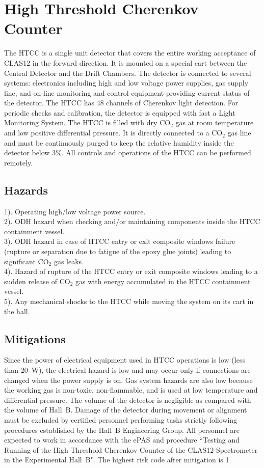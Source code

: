 \section{High Threshold Cherenkov Counter}

The HTCC is a single unit detector that covers the entire working acceptance of CLAS12 
in the forward direction. It is mounted on a special cart between the Central Detector 
and the Drift Chambers. The detector is connected to several systems: electronics including 
high and low voltage power supplies, gas supply line, and on-line monitoring and control 
equipment providing current status of the detector. The HTCC has 48 channels of Cherenkov 
light detection. For periodic checks and calibration, the detector is equipped with fast a 
Light Monitoring System. The HTCC is filled with dry CO$_2$ gas at room temperature and 
low positive differential pressure. It is directly connected to a CO$_2$ gas line and must 
be continuously purged to keep the relative humidity inside the detector below 3\%. All 
controls and operations of the HTCC can be performed remotely.
 
\subsection{Hazards} 

1). Operating high/low voltage power source. \\
2). ODH hazard when checking and/or maintaining components inside the HTCC containment vessel.\\
3). ODH hazard in case of HTCC entry or exit composite windows failure (rupture or 
separation due to fatigue of the epoxy glue joints) leading to significant CO$_2$ gas leaks.\\
4). Hazard of rupture of the HTCC entry or exit composite windows leading to a sudden release of 
CO$_2$ gas with energy accumulated in the HTCC containment vessel.\\
5). Any mechanical shocks to the HTCC while moving the system on its cart in the hall.

\subsection{Mitigations}

Since the power of electrical equipment used in HTCC operations is low (less than 20~W), the 
electrical hazard is low and may occur only if connections are changed when the power supply is on.
Gas system hazards are also low because the working gas is non-toxic, non-flammable, and is 
used at low temperature and differential pressure. The volume of the detector is negligible as 
compared with the volume of Hall~B. Damage of the detector during movement or alignment must be 
excluded by certified personnel performing tasks strictly following procedures established by 
the Hall~B Engineering Group. All personnel are expected to work in accordance with the ePAS and
procedure ``Testing and Running of the High Threshold Cherenkov Counter of the CLAS12 Spectrometer
in the Experimental Hall~B". The highest risk code after mitigation is 1.


